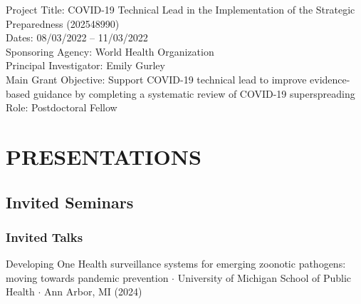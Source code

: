 \documentclass{cv}
\begin{document}
Project Title: COVID-19 Technical Lead in the Implementation of the Strategic Preparedness (202548990) \\
Dates: 08/03/2022 -- 11/03/2022 \\
Sponsoring Agency: World Health Organization \\
Principal Investigator: Emily Gurley \\
Main Grant Objective: Support COVID-19 technical lead to improve evidence-based guidance by completing a systematic review of COVID-19 superspreading \\
Role: Postdoctoral Fellow






\section*{PRESENTATIONS}

\subsection*{Invited Seminars}

\subsubsection*{Invited Talks}

Developing One Health surveillance systems for emerging zoonotic pathogens: moving towards pandemic prevention $\cdot$ University of Michigan School of Public Health $\cdot$ Ann Arbor, MI (2024)
\end{document}
